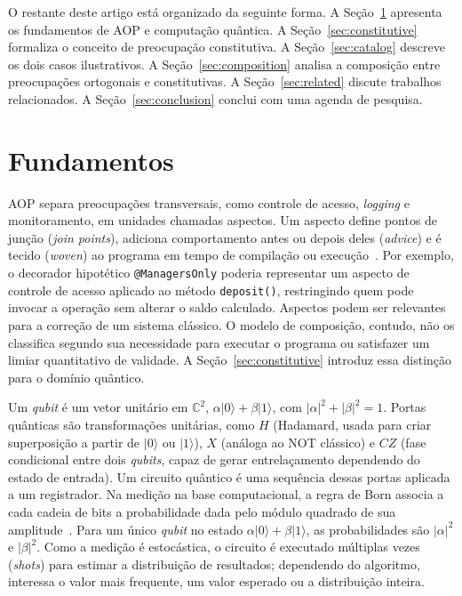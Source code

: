 \documentclass[sigconf]{acmart}
\begin{document}
O restante deste artigo está organizado da seguinte forma. A Seção~\ref{sec:background} apresenta os fundamentos de AOP e computação quântica. A Seção~\ref{sec:constitutive} formaliza o conceito de preocupação constitutiva. A Seção~\ref{sec:catalog} descreve os dois casos ilustrativos. A Seção~\ref{sec:composition} analisa a composição entre preocupações ortogonais e constitutivas. A Seção~\ref{sec:related} discute trabalhos relacionados. A Seção~\ref{sec:conclusion} conclui com uma agenda de pesquisa.

\section{Fundamentos}
\label{sec:background}

AOP separa preocupações transversais, como controle de acesso, \textit{logging} e monitoramento, em unidades chamadas aspectos. Um aspecto define pontos de junção (\textit{join points}), adiciona comportamento antes ou depois deles (\textit{advice}) e é tecido (\textit{woven}) ao programa em tempo de compilação ou execução~\cite{kiczales1997}. Por exemplo, o decorador hipotético \texttt{@ManagersOnly} poderia representar um aspecto de controle de acesso aplicado ao método \texttt{deposit()}, restringindo quem pode invocar a operação sem alterar o saldo calculado. Aspectos podem ser relevantes para a correção de um sistema clássico. O modelo de composição, contudo, não os classifica segundo sua necessidade para executar o programa ou satisfazer um limiar quantitativo de validade. A Seção~\ref{sec:constitutive} introduz essa distinção para o domínio quântico.

Um \textit{qubit} é um vetor unitário em $\mathbb{C}^2$, $\alpha|0\rangle + \beta|1\rangle$, com $|\alpha|^2 + |\beta|^2 = 1$. Portas quânticas são transformações unitárias, como $H$ (Hadamard, usada para criar superposição a partir de $|0\rangle$ ou $|1\rangle$), $X$ (análoga ao NOT clássico) e $CZ$ (fase condicional entre dois \textit{qubits}, capaz de gerar entrelaçamento dependendo do estado de entrada). Um circuito quântico é uma sequência dessas portas aplicada a um registrador. Na medição na base computacional, a regra de Born associa a cada cadeia de bits a probabilidade dada pelo módulo quadrado de sua amplitude~\cite{nielsen2010}. Para um único \textit{qubit} no estado $\alpha|0\rangle+\beta|1\rangle$, as probabilidades são $|\alpha|^2$ e $|\beta|^2$. Como a medição é estocástica, o circuito é executado múltiplas vezes (\textit{shots}) para estimar a distribuição de resultados; dependendo do algoritmo, interessa o valor mais frequente, um valor esperado ou a distribuição inteira.
\end{document}
